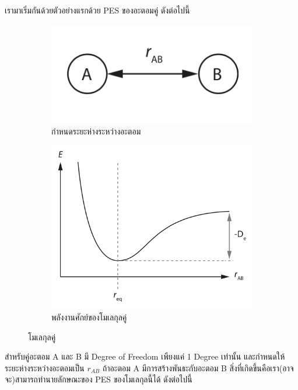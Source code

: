เรามาเริ่มกันด้วยตัวอย่างแรกด้วย PES ของอะตอมคู่ ดังต่อไปนี้

\begin{figure}[htbp]
    \centering
    \begin{subfigure}{0.5\textwidth}
        \centering
        \includegraphics[width=0.9\linewidth]{fig/diatomic_molecule.png}
        \caption{กำหนดระยะห่างระหว่างอะตอม}
        \label{fig:diatomic_mol}
    \end{subfigure}%
    \begin{subfigure}{0.5\textwidth}
        \centering
        \includegraphics[width=0.9\linewidth]{fig/PES_diatomic_mol.png}
        \caption{พลังงานศักย์ของโมเลกุลคู่}
        \label{fig:PES_diatomic}
    \end{subfigure}
    \caption{โมเลกุลคู่}
    \label{fig:diatomic_mol_and_PES}
\end{figure}

สำหรับคู่อะตอม A และ B มี Degree of Freedom เพียงแค่ 1 Degree เท่านั้น และกำหนดให้ระยะห่างระหว่างอะตอมเป็น $r_{AB}$ ถ้าอะตอม 
A มีการสร้างพันธะกับอะตอม B สิ่งที่เกิดขึ้นคือเรา(อาจจะ)สามารถทำนายลักษณะของ PES ของโมเลกุลนี้ได้ ดังต่อไปนี้

